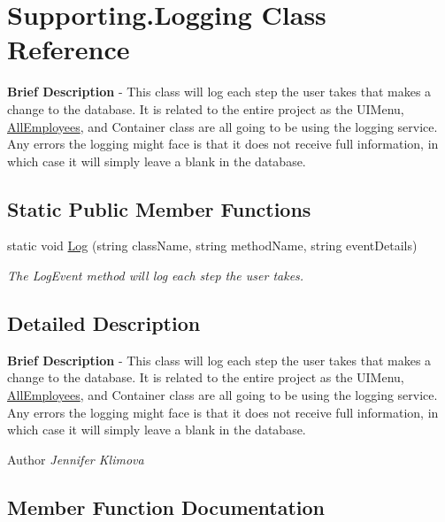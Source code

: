\hypertarget{class_supporting_1_1_logging}{}\section{Supporting.\+Logging Class Reference}
\label{class_supporting_1_1_logging}


{\bfseries Brief Description} -\/ This class will log each step the user takes that makes a change to the database. It is related to the entire project as the U\+I\+Menu, \hyperlink{namespace_all_employees}{All\+Employees}, and Container class are all going to be using the logging service. Any errors the logging might face is that it does not receive full information, in which case it will simply leave a blank in the database.  


\subsection*{Static Public Member Functions}
\begin{DoxyCompactItemize}
\item 
static void \hyperlink{class_supporting_1_1_logging_a60b0734ed288df6dc8af94f8fe4a0143}{Log} (string class\+Name, string method\+Name, string event\+Details)
\begin{DoxyCompactList}\small\item\em The Log\+Event method will log each step the user takes. \end{DoxyCompactList}\end{DoxyCompactItemize}


\subsection{Detailed Description}
{\bfseries Brief Description} -\/ This class will log each step the user takes that makes a change to the database. It is related to the entire project as the U\+I\+Menu, \hyperlink{namespace_all_employees}{All\+Employees}, and Container class are all going to be using the logging service. Any errors the logging might face is that it does not receive full information, in which case it will simply leave a blank in the database. 

\begin{DoxyAuthor}{Author}
{\itshape Jennifer Klimova} 
\end{DoxyAuthor}


\subsection{Member Function Documentation}
\hypertarget{class_supporting_1_1_logging_a60b0734ed288df6dc8af94f8fe4a0143}{}
